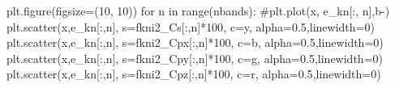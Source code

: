 \documentclass[
  letterpaper,
  DIV=11,
  numbers=noendperiod]{scrreprt}
\newenvironment{Shaded}{\begin{snugshade}}{\end{snugshade}}
\newcommand{\BuiltInTok}[1]{\textcolor[rgb]{0.00,0.23,0.31}{#1}}
\newcommand{\CommentTok}[1]{\textcolor[rgb]{0.37,0.37,0.37}{#1}}
\newcommand{\ControlFlowTok}[1]{\textcolor[rgb]{0.00,0.23,0.31}{#1}}
\newcommand{\DecValTok}[1]{\textcolor[rgb]{0.68,0.00,0.00}{#1}}
\newcommand{\FloatTok}[1]{\textcolor[rgb]{0.68,0.00,0.00}{#1}}
\newcommand{\KeywordTok}[1]{\textcolor[rgb]{0.00,0.23,0.31}{#1}}
\newcommand{\NormalTok}[1]{\textcolor[rgb]{0.00,0.23,0.31}{#1}}
\newcommand{\OperatorTok}[1]{\textcolor[rgb]{0.37,0.37,0.37}{#1}}
\newcommand{\StringTok}[1]{\textcolor[rgb]{0.13,0.47,0.30}{#1}}
\begin{document}
\begin{Shaded}
\begin{Highlighting}[]
\NormalTok{plt.figure(figsize}\OperatorTok{=}\NormalTok{(}\DecValTok{10}\NormalTok{, }\DecValTok{10}\NormalTok{))}
\ControlFlowTok{for}\NormalTok{ n }\KeywordTok{in} \BuiltInTok{range}\NormalTok{(nbands):}
    \CommentTok{\#plt.plot(x, e\_kn[:, n],\textquotesingle{}b{-}\textquotesingle{})}
\NormalTok{    plt.scatter(x,e\_kn[:,n], s}\OperatorTok{=}\NormalTok{fkni2\_Cs[:,n]}\OperatorTok{*}\DecValTok{100}\NormalTok{, c}\OperatorTok{=}\StringTok{\textquotesingle{}y\textquotesingle{}}\NormalTok{, alpha}\OperatorTok{=}\FloatTok{0.5}\NormalTok{,linewidth}\OperatorTok{=}\DecValTok{0}\NormalTok{)}
\NormalTok{    plt.scatter(x,e\_kn[:,n], s}\OperatorTok{=}\NormalTok{fkni2\_Cpx[:,n]}\OperatorTok{*}\DecValTok{100}\NormalTok{, c}\OperatorTok{=}\StringTok{\textquotesingle{}b\textquotesingle{}}\NormalTok{, alpha}\OperatorTok{=}\FloatTok{0.5}\NormalTok{,linewidth}\OperatorTok{=}\DecValTok{0}\NormalTok{)}
\NormalTok{    plt.scatter(x,e\_kn[:,n], s}\OperatorTok{=}\NormalTok{fkni2\_Cpy[:,n]}\OperatorTok{*}\DecValTok{100}\NormalTok{, c}\OperatorTok{=}\StringTok{\textquotesingle{}g\textquotesingle{}}\NormalTok{, alpha}\OperatorTok{=}\FloatTok{0.5}\NormalTok{,linewidth}\OperatorTok{=}\DecValTok{0}\NormalTok{)}
\NormalTok{    plt.scatter(x,e\_kn[:,n], s}\OperatorTok{=}\NormalTok{fkni2\_Cpz[:,n]}\OperatorTok{*}\DecValTok{100}\NormalTok{, c}\OperatorTok{=}\StringTok{\textquotesingle{}r\textquotesingle{}}\NormalTok{, alpha}\OperatorTok{=}\FloatTok{0.5}\NormalTok{,linewidth}\OperatorTok{=}\DecValTok{0}\NormalTok{)}


\end{Highlighting}
\end{Shaded}
\end{document}
